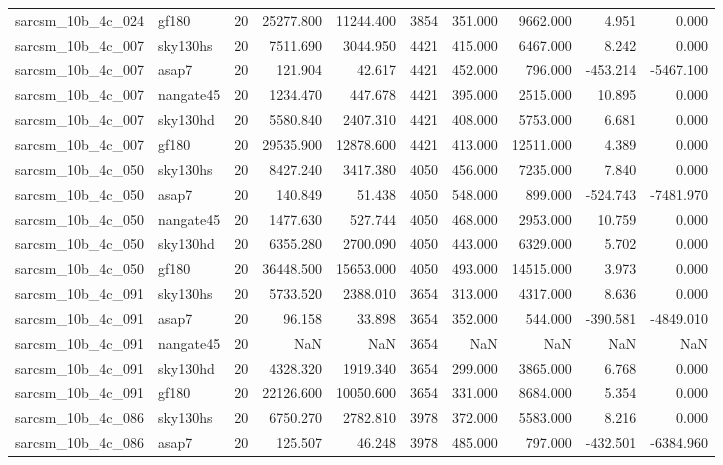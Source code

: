 \documentclass{article}
\begin{document}
\begin{longtable}{llrrrrrrrr}
sarcsm\_10b\_4c\_024 & gf180 & 20 & 25277.800 & 11244.400 & 3854 & 351.000 & 9662.000 & 4.951 & 0.000 \\
sarcsm\_10b\_4c\_007 & sky130hs & 20 & 7511.690 & 3044.950 & 4421 & 415.000 & 6467.000 & 8.242 & 0.000 \\
sarcsm\_10b\_4c\_007 & asap7 & 20 & 121.904 & 42.617 & 4421 & 452.000 & 796.000 & -453.214 & -5467.100 \\
sarcsm\_10b\_4c\_007 & nangate45 & 20 & 1234.470 & 447.678 & 4421 & 395.000 & 2515.000 & 10.895 & 0.000 \\
sarcsm\_10b\_4c\_007 & sky130hd & 20 & 5580.840 & 2407.310 & 4421 & 408.000 & 5753.000 & 6.681 & 0.000 \\
sarcsm\_10b\_4c\_007 & gf180 & 20 & 29535.900 & 12878.600 & 4421 & 413.000 & 12511.000 & 4.389 & 0.000 \\
sarcsm\_10b\_4c\_050 & sky130hs & 20 & 8427.240 & 3417.380 & 4050 & 456.000 & 7235.000 & 7.840 & 0.000 \\
sarcsm\_10b\_4c\_050 & asap7 & 20 & 140.849 & 51.438 & 4050 & 548.000 & 899.000 & -524.743 & -7481.970 \\
sarcsm\_10b\_4c\_050 & nangate45 & 20 & 1477.630 & 527.744 & 4050 & 468.000 & 2953.000 & 10.759 & 0.000 \\
sarcsm\_10b\_4c\_050 & sky130hd & 20 & 6355.280 & 2700.090 & 4050 & 443.000 & 6329.000 & 5.702 & 0.000 \\
sarcsm\_10b\_4c\_050 & gf180 & 20 & 36448.500 & 15653.000 & 4050 & 493.000 & 14515.000 & 3.973 & 0.000 \\
sarcsm\_10b\_4c\_091 & sky130hs & 20 & 5733.520 & 2388.010 & 3654 & 313.000 & 4317.000 & 8.636 & 0.000 \\
sarcsm\_10b\_4c\_091 & asap7 & 20 & 96.158 & 33.898 & 3654 & 352.000 & 544.000 & -390.581 & -4849.010 \\
sarcsm\_10b\_4c\_091 & nangate45 & 20 & NaN & NaN & 3654 & NaN & NaN & NaN & NaN \\
sarcsm\_10b\_4c\_091 & sky130hd & 20 & 4328.320 & 1919.340 & 3654 & 299.000 & 3865.000 & 6.768 & 0.000 \\
sarcsm\_10b\_4c\_091 & gf180 & 20 & 22126.600 & 10050.600 & 3654 & 331.000 & 8684.000 & 5.354 & 0.000 \\
sarcsm\_10b\_4c\_086 & sky130hs & 20 & 6750.270 & 2782.810 & 3978 & 372.000 & 5583.000 & 8.216 & 0.000 \\
sarcsm\_10b\_4c\_086 & asap7 & 20 & 125.507 & 46.248 & 3978 & 485.000 & 797.000 & -432.501 & -6384.960 \\

\end{longtable}
\end{document}
